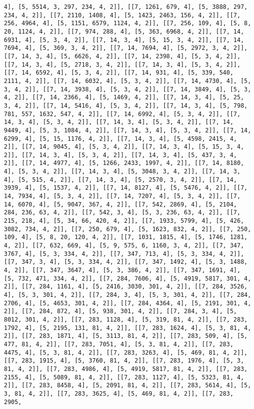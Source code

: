 \documentclass[12pt,fleqn]{article}\usepackage{../../common}
\begin{document}
\begin{verbatim}
4], [5, 5514, 3, 297, 234, 4, 2]], [[7, 1261, 679, 4], [5, 3888, 297, 234, 4, 2]], [[7, 2110, 1408, 4], [5, 1423, 2463, 156, 4, 2]], [[7, 256, 4964, 4], [5, 1151, 6579, 1124, 4, 2]], [[7, 256, 109, 4], [5, 8, 20, 1124, 4, 2]], [[7, 974, 288, 4], [5, 363, 6968, 4, 2]], [[7, 14, 6931, 4], [5, 3, 4, 2]], [[7, 14, 3, 4], [5, 15, 3, 4, 2]], [[7, 14, 7694, 4], [5, 369, 3, 4, 2]], [[7, 14, 7694, 4], [5, 2972, 3, 4, 2]], [[7, 14, 3, 4], [5, 6626, 4, 2]], [[7, 14, 2398, 4], [5, 3, 4, 2]], [[7, 14, 3, 4], [5, 2718, 3, 4, 2]], [[7, 14, 3, 4], [5, 3, 4, 2]], [[7, 14, 6592, 4], [5, 3, 4, 2]], [[7, 14, 931, 4], [5, 339, 540, 2111, 4, 2]], [[7, 14, 6032, 4], [5, 3, 4, 2]], [[7, 14, 4730, 4], [5, 3, 4, 2]], [[7, 14, 3938, 4], [5, 3, 4, 2]], [[7, 14, 3849, 4], [5, 3, 4, 2]], [[7, 14, 2366, 4], [5, 1469, 4, 2]], [[7, 14, 3, 4], [5, 25, 3, 4, 2]], [[7, 14, 5416, 4], [5, 3, 4, 2]], [[7, 14, 3, 4], [5, 798, 781, 557, 1632, 547, 4, 2]], [[7, 14, 6992, 4], [5, 3, 4, 2]], [[7, 14, 3, 4], [5, 3, 4, 2]], [[7, 14, 3, 4], [5, 3, 4, 2]], [[7, 14, 9449, 4], [5, 3, 1084, 4, 2]], [[7, 14, 3, 4], [5, 3, 4, 2]], [[7, 14, 6299, 4], [5, 15, 1176, 4, 2]], [[7, 14, 3, 4], [5, 4598, 2415, 4, 2]], [[7, 14, 9045, 4], [5, 3, 4, 2]], [[7, 14, 3, 4], [5, 15, 3, 4, 2]], [[7, 14, 3, 4], [5, 3, 4, 2]], [[7, 14, 3, 4], [5, 437, 3, 4, 2]], [[7, 14, 4977, 4], [5, 1266, 2433, 1997, 4, 2]], [[7, 14, 8180, 4], [5, 3, 4, 2]], [[7, 14, 3, 4], [5, 3048, 3, 4, 2]], [[7, 14, 3, 4], [5, 515, 4, 2]], [[7, 14, 3, 4], [5, 2570, 3, 4, 2]], [[7, 14, 3939, 4], [5, 1537, 4, 2]], [[7, 14, 8127, 4], [5, 5476, 4, 2]], [[7, 14, 7934, 4], [5, 3, 4, 2]], [[7, 14, 7207, 4], [5, 3, 4, 2]], [[7, 14, 6070, 4], [5, 9047, 367, 4, 2]], [[7, 542, 2869, 4], [5, 2104, 284, 236, 63, 4, 2]], [[7, 542, 3, 4], [5, 3, 236, 63, 4, 2]], [[7, 215, 218, 4], [5, 34, 66, 420, 4, 2]], [[7, 1933, 5799, 4], [5, 426, 3082, 734, 4, 2]], [[7, 250, 679, 4], [5, 1623, 832, 4, 2]], [[7, 250, 109, 4], [5, 8, 20, 120, 4, 2]], [[7, 1031, 1815, 4], [5, 1746, 1281, 4, 2]], [[7, 632, 669, 4], [5, 9, 575, 6, 1160, 3, 4, 2]], [[7, 347, 3767, 4], [5, 3, 334, 4, 2]], [[7, 347, 713, 4], [5, 3, 334, 4, 2]], [[7, 347, 3, 4], [5, 3, 334, 4, 2]], [[7, 347, 1492, 4], [5, 3, 1488, 4, 2]], [[7, 347, 3647, 4], [5, 3, 386, 4, 2]], [[7, 347, 1691, 4], [5, 732, 471, 334, 4, 2]], [[7, 284, 7606, 4], [5, 4919, 5817, 301, 4, 2]], [[7, 284, 1161, 4], [5, 2416, 3030, 301, 4, 2]], [[7, 284, 3526, 4], [5, 3, 301, 4, 2]], [[7, 284, 3, 4], [5, 3, 301, 4, 2]], [[7, 284, 2706, 4], [5, 4653, 301, 4, 2]], [[7, 284, 4364, 4], [5, 2191, 301, 4, 2]], [[7, 284, 872, 4], [5, 938, 301, 4, 2]], [[7, 284, 3, 4], [5, 8012, 301, 4, 2]], [[7, 283, 1128, 4], [5, 319, 81, 4, 2]], [[7, 283, 1792, 4], [5, 2195, 131, 81, 4, 2]], [[7, 283, 1624, 4], [5, 3, 81, 4, 2]], [[7, 283, 1871, 4], [5, 3113, 81, 4, 2]], [[7, 283, 509, 4], [5, 477, 81, 4, 2]], [[7, 283, 7051, 4], [5, 3, 81, 4, 2]], [[7, 283, 4475, 4], [5, 3, 81, 4, 2]], [[7, 283, 3263, 4], [5, 469, 81, 4, 2]], [[7, 283, 1915, 4], [5, 3760, 81, 4, 2]], [[7, 283, 1976, 4], [5, 3, 81, 4, 2]], [[7, 283, 4986, 4], [5, 4919, 5817, 81, 4, 2]], [[7, 283, 2155, 4], [5, 5089, 81, 4, 2]], [[7, 283, 1127, 4], [5, 5323, 81, 4, 2]], [[7, 283, 8458, 4], [5, 2091, 81, 4, 2]], [[7, 283, 5614, 4], [5, 3, 81, 4, 2]], [[7, 283, 3625, 4], [5, 469, 81, 4, 2]], [[7, 283, 2905, 
\end{verbatim}
\end{document}

